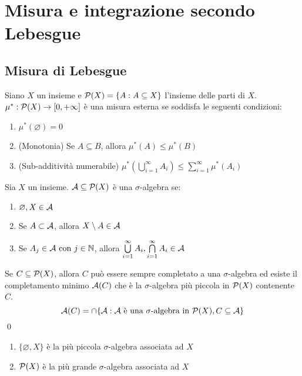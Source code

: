 \chapter{Misura e integrazione secondo Lebesgue}

\section{Misura di Lebesgue}

\begin{definition}
	Siano $X$ un insieme e $\mathcal{P}(X)=\{A:A\subseteq X\}$ l'insieme delle parti di $X$. $\mu^*:\mathcal{P}(X)\to [0,+\infty]$ è una misura esterna se soddisfa le seguenti condizioni:
	\begin{enumerate}
		\item $\mu^*(\varnothing)=0$
		\item (Monotonia) Se $A\subseteq B$, allora $\mu^*(A) \leq \mu^*(B)$
		\item (Sub-additività numerabile) $\mu^*\left(\bigcup\limits_{i=1}^\infty A_i\right)\leq \sum\limits_{i=1}^\infty \mu^*(A_i)$
	\end{enumerate}
\end{definition}

\begin{definition}
	Sia $X$ un insieme. $\mathcal{A} \subseteq \mathcal{P}(X)$ è una $\sigma$-algebra se:
	\begin{enumerate}
		\item $\varnothing, X \in \mathcal{A}$
		\item Se $A\subset \mathcal{A}$, allora $X \setminus A \in \mathcal{A}$
		\item Se $A_j \in \mathcal{A} \text{ con } j \in \mathbb{N}$, allora $\bigcup\limits_{i=1}^\infty A_i, \bigcap\limits_{i=1}^\infty A_i \in \mathcal{A}$
	\end{enumerate}
\end{definition}

\begin{prop}
	Se $C \subseteq \mathcal{P}(X)$, allora $C$ può essere sempre completato a una $\sigma$-algebra ed esiste il completamento minimo $\mathcal{A}(C)$ che è la $\sigma$-algebra più piccola in $\mathcal{P}(X)$ contenente $C$.
	$$
		\mathcal{A}(C)=\cap\{\mathcal{A}:\mathcal{A} \text{ è una } \sigma \text{-algebra in } \mathcal{P}(X), C \subseteq \mathcal{A}\}
	$$
	\qed
\end{prop}

\begin{remark}\leavevmode
	\begin{enumerate}
		\item $\{\varnothing,X\}$ è la più piccola $\sigma$-algebra associata ad $X$
		\item $\mathcal{P}(X)$ è la più grande $\sigma$-algebra associata ad $X$
	\end{enumerate}
\end{remark}

